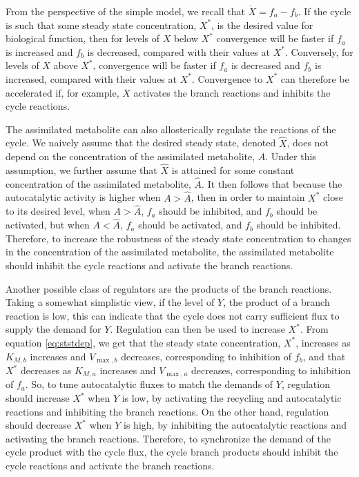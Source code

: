     From the perspective of the simple model, we recall that $\dot{X}=f_a-f_b$.
    If the cycle is such that some steady state concentration, $X^*$, is the desired value for biological function, then for levels of $X$ below $X^*$ convergence will be faster if $f_a$ is increased and $f_b$ is decreased, compared with their values at $X^*$.
    Conversely, for levels of $X$ above $X^*$, convergence will be faster if $f_a$ is decreased and $f_b$ is increased, compared with their values at $X^*$.
    Convergence to $X^*$ can therefore be accelerated if, for example, $X$ activates the branch reactions and inhibits the cycle reactions.

    The assimilated metabolite can also allosterically regulate the reactions of the cycle.
    We naively assume that the desired steady state, denoted $\hat{X}$, does not depend on the concentration of the assimilated metabolite, $A$.
    Under this assumption, we further assume that $\hat{X}$ is attained for some constant concentration of the assimilated metabolite, $\hat{A}$.
    It then follows that because the autocatalytic activity is higher when $A>\hat{A}$, then in order to maintain $X^*$ close to its desired level, when $A>\hat{A}$, $f_a$ should be inhibited, and $f_b$ should be activated, but when $A<\hat{A}$, $f_a$ should be activated, and $f_b$ should be inhibited.
    Therefore, to increase the robustness of the steady state concentration to changes in the concentration of the assimilated metabolite, the assimilated metabolite should inhibit the cycle reactions and activate the branch reactions.

    Another possible class of regulators are the products of the branch reactions.
    Taking a somewhat simplistic view, if the level of $Y$, the product of a branch reaction is low, this can indicate that the cycle does not carry sufficient flux to supply the demand for $Y$.
    Regulation can then be used to increase $X^*$.
    From equation \ref{eq:ststdep}, we get that the steady state concentration, $X^*$, increases as $K_{M,b}$ increases and $V_{\max,b}$ decreases, corresponding to inhibition of $f_b$, and that $X^*$ decreases as $K_{M,a}$ increases and $V_{\max,a}$ decreases, corresponding to inhibition of $f_a$.
    So, to tune autocatalytic fluxes to match the demands of $Y$, regulation should increase $X^*$ when $Y$ is low, by activating the recycling and autocatalytic reactions and inhibiting the branch reactions.
    On the other hand, regulation should decrease $X^*$ when $Y$ is high, by inhibiting the autocatalytic reactions and activating the branch reactions.
    Therefore, to synchronize the demand of the cycle product with the cycle flux, the cycle branch products should inhibit the cycle reactions and activate the branch reactions.

